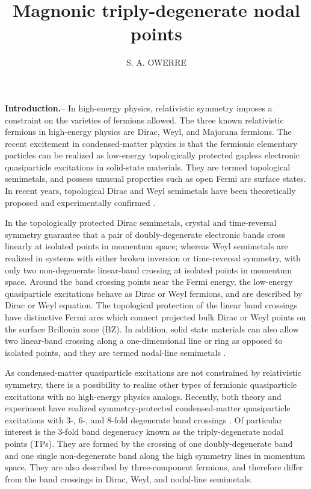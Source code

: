 \documentclass[doublecol]{epl2}
\title{Magnonic triply-degenerate nodal points}
\author{S. A. OWERRE\inst{1} }
\institute{                   
  \inst{1} Perimeter Institute for Theoretical Physics - 31 Caroline St. N., Waterloo, Ontario N2L 2Y5, Canada\\
}
\begin{document}
\maketitle


\textbf{Introduction.}-- In high-energy physics, relativistic  symmetry imposes a constraint  on the varieties of fermions allowed.  The three known relativistic fermions in high-energy physics are  Dirac, Weyl, and Majorana fermions.  The recent excitement in condensed-matter physics is  that the fermionic elementary particles can be realized as low-energy  topologically protected gapless electronic  quasiparticle excitations in solid-state materials.  They are   termed  topological semimetals, and possess unusual properties such as open Fermi arc surface states. In recent years, topological Dirac and Weyl semimetals have been theoretically proposed \cite{dsm1,dsm2,wsm0,wsm1,wsm2} and experimentally confirmed \cite{dsm3,dsm4,dsm5,wsm3,wsm4}.  

In the topologically protected Dirac semimetals, crystal and time-reversal symmetry guarantee that a pair of doubly-degenerate electronic bands cross linearly at isolated points in momentum space; whereas  Weyl semimetals are realized in systems with either broken inversion or time-reversal symmetry, with only two non-degenerate linear-band crossing at isolated points in momentum space. Around the band crossing points near the Fermi energy, the low-energy quasiparticle excitations behave as Dirac or Weyl  fermions, and are described by Dirac or Weyl equation.  The topological protection of the linear band crossings have distinctive Fermi arcs which connect projected bulk Dirac or Weyl points on the surface Brillouin zone (BZ).  In addition, solid state materials can also allow  two linear-band crossing  along a one-dimensional line or ring as opposed to isolated points, and they are termed nodal-line semimetals \cite{nsm,nsm1}.

As condensed-matter quasiparticle excitations are not constrained by relativistic  symmetry, there is a possibility to realize other types of fermionic quasiparticle excitations with no high-energy physics analogs. Recently, both theory and experiment have realized symmetry-protected condensed-matter quasiparticle excitations with 3-, 6-, and 8-fold degenerate band crossings \cite{tp0,tp1,tp2,tp3,tp4,tp5,tp6,tp6a, tp6b, tp7,tp8, tp8a}. Of particular interest is the 3-fold band degeneracy known as the triply-degenerate nodal points (TPs). They are formed by the crossing of one doubly-degenerate band and one single non-degenerate band along the high symmetry lines in momentum space. They are also described by three-component fermions, and therefore differ from the band crossings in Dirac, Weyl, and nodal-line semimetals.  
\end{document}
